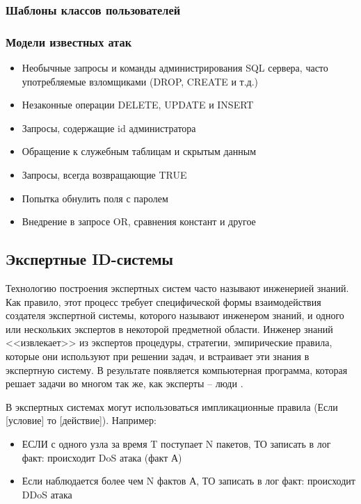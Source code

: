\subsubsection{Шаблоны классов пользователей}


\subsubsection{Модели известных атак}
\begin{itemize}
	\item Необычные запросы и команды администрирования SQL сервера, часто употребляемые взломщиками (DROP, CREATE и т.д.)
	\item Незаконные операции DELETE, UPDATE и INSERT
	\item Запросы, содержащие id администратора
	\item Обращение к служебным таблицам и скрытым данным
	\item Запросы, всегда возвращающие TRUE
	\item Попытка обнулить поля с паролем
	\item Внедрение в запросе OR, сравнения констант и другое
\end{itemize}


\subsection{Экспертные ID-системы}

Технологию построения экспертных систем часто называют инженерией знаний. Как правило, этот процесс требует специфической формы взаимодействия создателя экспертной системы, которого называют инженером знаний, и одного или нескольких экспертов в некоторой предметной области.  Инженер знаний <<извлекает>> из экспертов процедуры, стратегии,  эмпирические правила, которые они используют при решении задач, и  встраивает эти знания в экспертную систему. В результате появляется   компьютерная программа, которая решает задачи во многом так же, как   эксперты -- люди \autocite{ExpertSystems}.

В экспертных системах могут использоваться импликационные правила (Если [условие] то [действие]). Например:
\begin{itemize}
	\item ЕСЛИ с одного узла за время T поступает N пакетов, ТО записать в лог факт: происходит DoS атака (факт А)
	\item Если наблюдается более чем N фактов А, ТО записать в лог факт: происходит DDoS атака
\end{itemize}


